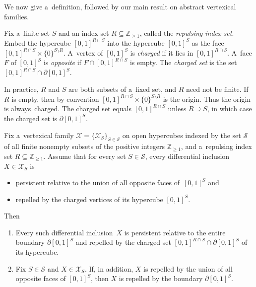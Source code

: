 We now give a~def\/inition, followed by our main result on abstract vertexical families.
\begin{Definition}
\label{d:charged}
Fix a~f\/inite set $S$ and an index set $R\subseteq\mathbb{Z}_{\geq1}$, called the \emph{repulsing index set}.
Embed the hypercube $[0,1]^{R\cap S}$ into the hypercube $[0,1]^S$ as the face $[0,1]^{R\cap S}\times\{0\}^{S\setminus
R}$.
A~vertex of $[0,1]^S$ is \emph{charged} if it lies in $[0,1]^{R\cap S}$.
A~face $F$ of $[0,1]^S$ is \emph{opposite} if $F\cap[0,1]^{R\cap S}$ is empty.
The \emph{charged set} is the set $[0,1]^{R\cap S}\cap\partial[0,1]^S$.
\end{Definition}

In practice, $R$ and $S$ are both subsets of a~f\/ixed set, and $R$ need not be f\/inite.
If $R$ is empty, then by convention $[0,1]^{R\cap S}\times\{0\}^{S\setminus R}$ is the origin.
Thus the origin is always~charged.
The charged set equals $[0,1]^{R\cap S}$ unless $R\supseteq S$, in which case the charged set is $\partial[0,1]^S$.
\begin{Theorem}
\label{t:vertexical}
Fix a~vertexical family $\mathcal X=\{\mathcal X_S\}_{S\in\mathcal S}$ on open hypercubes indexed by the set $\mathcal
S$ of all finite nonempty subsets of the positive integers $\mathbb{Z}_{\geq1}$, and a~repulsing index set
$R\subseteq\mathbb{Z}_{\geq1}$.
Assume that for every set $S\in\mathcal S$, every differential inclusion $X\in\mathcal X_S$ is
\begin{itemize}\itemsep=-0.5pt
\item persistent relative to the union of all opposite faces of\/~$[0,1]^S$ and \item repelled by the charged vertices
of its hypercube $[0,1]^S$.
\end{itemize}
Then
\begin{enumerate}\itemsep=-0.5pt
\item[$1.$] Every such differential inclusion~$X$ is persistent relative to the entire boundary $\partial[0,1]^S$ and
repelled by the charged set $[0,1]^{R\cap S}\cap\partial[0,1]^S$ of its hypercube.
\item[$2.$] Fix $S\in\mathcal S$ and $X\in\mathcal X_S$.
If, in addition, $X$ is repelled by the union of all opposite faces of\/ $[0,1]^S$, then $X$ is repelled by the
boundary $\partial[0,1]^S$.
\end{enumerate}
\end{Theorem}

